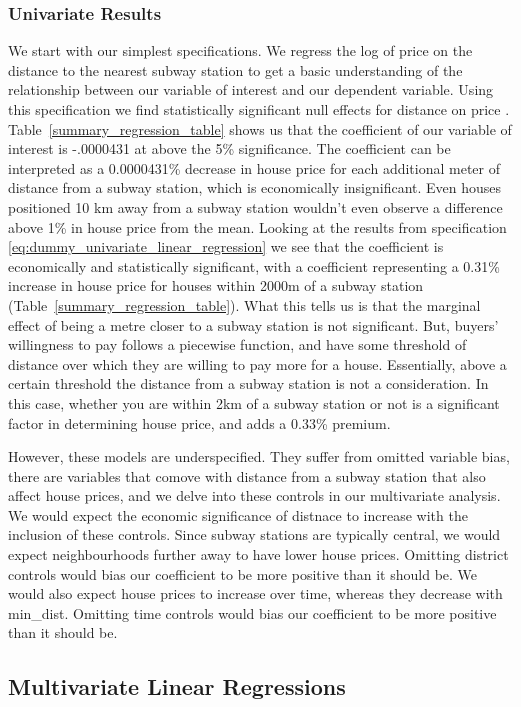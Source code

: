 \subsubsection{Univariate Results}
We start with our simplest specifications. We regress the log of price on the distance to the nearest subway station to get a basic understanding of the 
relationship between our variable of interest and our dependent variable. 
Using this specification we find statistically significant null effects for distance on price . 
Table~\ref{summary_regression_table} shows us that the coefficient of our variable of interest is -.0000431 at above the 5\% significance.
The coefficient can be interpreted as a 0.0000431\% decrease in house price for each additional meter of distance from a subway station, which is economically insignificant.
 Even houses positioned 10 km away from a subway station wouldn't even observe a difference above 1\% in house price from the mean.
Looking at the results from specification \ref{eq:dummy_univariate_linear_regression} we see that the coefficient is economically and statistically significant,
with a coefficient representing a 0.31\% increase in house price for houses within 2000m of a subway station (Table~\ref{summary_regression_table}).
What this tells us is that the marginal effect of being a metre closer to a subway station is not significant. But, buyers' willingness to pay follows a piecewise function, and have some threshold of distance over which
they are willing to pay more for a house. Essentially, above a certain threshold the distance from a subway station is not a consideration.
In this case, whether you are within 2km of a subway station or not is a significant factor in determining house price, and adds a 0.33\% premium.

However, these models are underspecified. They suffer from omitted variable bias, there are variables that comove with distance from a subway station that also affect house prices, and we delve into these
controls in our multivariate analysis. We would expect the economic significance of distnace to increase with the inclusion of these controls.
Since subway stations are typically central, we would expect neighbourhoods further away to have lower house prices. Omitting 
district controls would bias our coefficient to be more positive than it should be. We would also expect house prices to increase over time, whereas they decrease with min\_dist. Omitting time controls would bias our coefficient to be more 
positive than it should be.
\subsection{Multivariate Linear Regressions}

